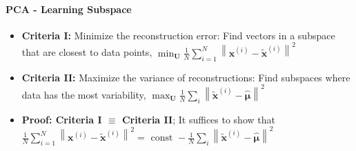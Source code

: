 \documentclass[10pt]{article}
\begin{document}
\paragraph{PCA - Learning Subspace}
\begin{itemize}
	\setlength\itemsep{-0.45em}
	\item \textbf{Criteria I:} Minimize the reconstruction error: Find vectors in a subspace that are closest to data points, $\min _{\mathbf{U}} \frac{1}{N} \sum_{i=1}^{N}\left\|\mathbf{x}^{(i)}-\tilde{\mathbf{x}}^{(i)}\right\|^{2}$
	\item \textbf{Criteria II:} Maximize the variance of reconstructions: Find subspaces where data has the most variability, $\max _{\mathbf{U}} \frac{1}{N} \sum_{i}\left\|\tilde{\mathbf{x}}^{(i)}-\hat{\boldsymbol{\mu}}\right\|^{2}$
	\item \textbf{Proof: Criteria I $\equiv$ Criteria II}; It suffices to show that $\frac{1}{N} \sum_{i=1}^{N}\left\|\mathbf{x}^{(i)}-\tilde{\mathbf{x}}^{(i)}\right\|^{2}=\text { const }-\frac{1}{N} \sum_{i}\left\|\tilde{\mathbf{x}}^{(i)}-\hat{\boldsymbol{\mu}}\right\|^{2}$
\end{itemize}
\end{document}
